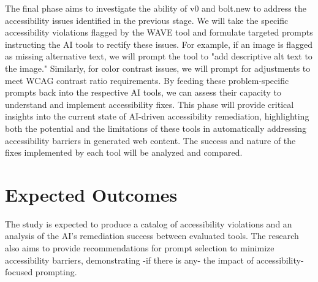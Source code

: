 \documentclass{article}
\begin{document}
The final phase aims to investigate the ability of v0 and bolt.new to address the accessibility issues identified in the previous stage. We will take the specific accessibility violations flagged by the WAVE tool and formulate targeted prompts instructing the AI tools to rectify these issues. For example, if an image is flagged as missing alternative text, we will prompt the tool to "add descriptive alt text to the image." Similarly, for color contrast issues, we will prompt for adjustments to meet WCAG contrast ratio requirements. By feeding these problem-specific prompts back into the respective AI tools, we can assess their capacity to understand and implement accessibility fixes. This phase will provide critical insights into the current state of AI-driven accessibility remediation, highlighting both the potential and the limitations of these tools in automatically addressing accessibility barriers in generated web content. The success and nature of the fixes implemented by each tool will be analyzed and compared.

\section{Expected Outcomes}
The study is expected to produce a catalog of accessibility violations and an analysis of the AI's remediation success between evaluated tools. The research also aims to provide recommendations for prompt selection to minimize accessibility barriers, demonstrating -if there is any- the impact of accessibility-focused prompting.

\pagebreak



\end{document}
